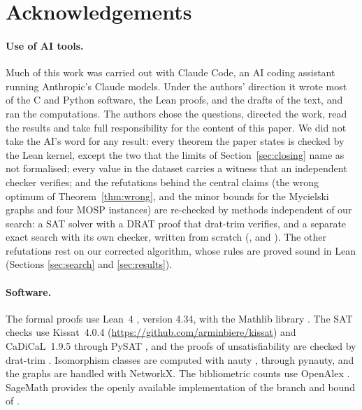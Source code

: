 \section*{Acknowledgements}

\paragraph{Use of AI tools.} Much of this work was carried out with Claude Code,
an AI coding assistant running Anthropic's Claude models. Under the authors'
direction it wrote most of the C and Python software, the Lean proofs, and the
drafts of the text, and ran the computations. The
authors chose the questions, directed the work, read the results and take full
responsibility for the content of this paper. We did not take the AI's word for any result: every theorem the paper states
is checked by the Lean kernel, except the two that the limits of
Section~\ref{sec:closing} name as not formalised; every value in
the dataset carries a witness that an independent checker verifies; and the
refutations behind the central claims (the wrong optimum of
Theorem~\ref{thm:wrong}, and the minor bounds for the Mycielski graphs and four
MOSP instances) are re-checked by methods independent of our search: a SAT solver with a DRAT
proof that drat-trim verifies, and a separate exact search with its own
checker, written from scratch (,
 and
).
The other refutations rest on our corrected algorithm, whose rules are proved
sound in Lean (Sections \ref{sec:search} and \ref{sec:results}).

\paragraph{Software.} The formal proofs use Lean~4 \citep{MouraUllrich2021},
version 4.34, with the Mathlib library \citep{Mathlib2020}. The SAT checks use
Kissat~4.0.4 (\url{https://github.com/arminbiere/kissat}) and
CaDiCaL~1.9.5 \citep{CaDiCaL2024} through PySAT \citep{PySAT2018}, and the
proofs of unsatisfiability are checked by drat-trim \citep{WetzlerHeuleHunt2014}.
Isomorphism classes are computed with nauty \citep{McKayPiperno2014}, through
pynauty, and the graphs are handled with NetworkX. The bibliometric counts use
OpenAlex \citep{Priem2022}. SageMath provides the openly available
implementation of the branch and bound of \citet{CoudertMazauricNisse2016}.
